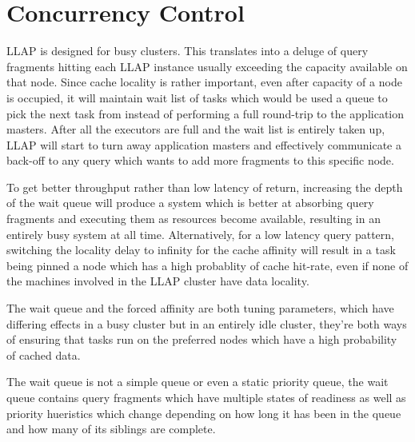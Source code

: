 \section{Concurrency Control}

LLAP is designed for busy clusters. This translates into a deluge of query fragments hitting each LLAP instance 
usually exceeding the capacity available on that node. Since cache locality is rather important, even after 
capacity of a node is occupied, it will maintain wait list of tasks which would be used a queue to pick the 
next task from instead of performing a full round-trip to the application masters. After all the executors are
full and the wait list is entirely taken  up, LLAP will start to turn away application masters and effectively
communicate a back-off to any query which wants to add more fragments to this specific node.

To get better throughput rather than low latency of return, increasing the depth of the wait queue will 
produce a system which is better at absorbing query fragments and executing them as resources become available,
resulting in an entirely busy system at all time. Alternatively, for a low latency query pattern, switching the locality delay to infinity for the cache affinity
will result in a task being pinned a node which has a high probablity of cache hit-rate, even if none of the machines
involved in the LLAP cluster have data locality. 

The wait queue and the forced affinity are both tuning parameters, which have differing effects in a busy cluster but in an entirely
idle cluster, they're both ways of ensuring that tasks run on the preferred nodes which have a high probability of cached data.


The wait queue is not a simple queue or even a static priority queue, the wait queue contains query fragments which have multiple
states of readiness as well as priority hueristics which change depending on how long it has been in the queue and how many of its 
siblings are complete. 

